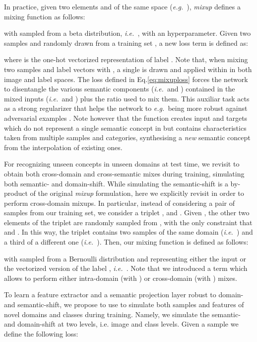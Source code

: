 \documentclass[runningheads]{llncs}
\newcommand{\eg}{\emph{e.g.~}}
\newcommand{\ie}{\emph{i.e.~}}
\begin{document}
In practice, given two elements  and  of the same space (\eg ), \textit{mixup} \cite{zhang2017mixup} defines a mixing function  as follows: 

with  sampled from a beta distribution, \ie , with  an hyperparameter. Given two samples  and  randomly drawn from a training set , a new loss term is defined as:

where  is the one-hot vectorized representation of label . Note that, when mixing two samples and label vectors with , a single  is drawn and applied within  in both image and label spaces. The loss defined in Eq.\eqref{eq:mixuploss} forces the network to disentangle the various semantic components (\ie  and ) contained in the mixed inputs (\ie  and ) plus the ratio  used to mix them.
This auxiliar task acts as a strong regularizer that helps the network to \eg being more robust against adversarial examples \cite{zhang2017mixup}. Note however that the function  creates input and targets which {do not represent} a single semantic concept in  but contains characteristics taken from multiple samples and categories, synthesising a \textit{new} semantic concept from the interpolation of existing ones. 

For recognizing unseen concepts in unseen domains at test time, we revisit  to obtain both cross-domain and cross-semantic mixes during training, simulating both semantic- and domain-shift. While simulating the semantic-shift is a by-product of the original \textit{mixup} formulation, here we explicitly revisit  in order to perform cross-domain mixups. In particular, instead of considering a pair of samples from our training set, we consider a triplet ,  and . Given , the other two elements of the triplet are randomly sampled from , with the only constraint that  and . In this way, the triplet contains two samples of the same domain (\ie ) and a third of a different one (\ie ). Then, our mixing function  is defined as follows: 

with  sampled from a Bernoulli distribution  and  representing either the input  or the vectorized version of the label , \ie . Note that we introduced a term  which allows to perform either intra-domain (with ) or cross-domain (with ) mixes.  

To learn a feature extractor  and a semantic projection layer  robust to domain- and semantic-shift, we propose to use   to simulate both samples and features of novel domains and classes during training. Namely, we simulate the semantic- and domain-shift at two levels, i.e. image and class levels. 
 Given a sample  we define the following loss:
\end{document}
